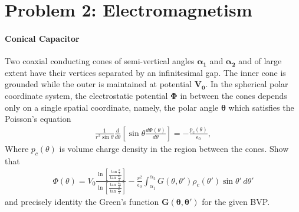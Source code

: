 \documentclass{article}
\begin{document}
{	\section*{Problem 2: Electromagnetism}
	\paragraph{Conical Capacitor} Two coaxial conducting cones of semi-vertical angles $\bm{\alpha_1}$ and $\bm{\alpha_2}$ and of large extent have their vertices separated by an infinitesimal gap. The inner cone is grounded while the outer is maintained at potential $\bm{V_0}$. In the spherical polar coordinate system, the electrostatic potential $\bm{\Phi}$ in between the cones depends only on a single spatial coordinate, namely, the polar angle $\bm{\theta}$ which satisfies the Poisson's equation
		\begin{equation*}
			\begin{split}
				\frac{1}{r^2 \sin \theta} \frac{d}{d\theta} \left[ \sin \theta \frac{d \Phi(\theta)}{d\theta} \right] = -\frac{p_c(\theta)}{\epsilon_0},
			\end{split}
		\end{equation*}
		Where $p_c(\theta)$ is volume charge density in the region between the cones. Show that
		\begin{equation*}
			\begin{split}
				\Phi(\theta) = V_0 \frac{ \ln \left[ \frac{\tan \tfrac{\theta}{2}} {\tan \tfrac{\alpha_1}{2}} \right] }{ \ln \left[ \frac{\tan \tfrac{\alpha_2}{2}} {\tan \tfrac{\alpha_1}{2}} \right] } - \frac{r^2}{\epsilon_0} \int_{\alpha_1}^{\alpha_2} G(\theta, \theta') \rho_c (\theta') \sin \theta' \, d\theta' 
			\end{split}
		\end{equation*}
		and precisely identity the Green's function $\bm{G(\theta, \theta')}$ for the given BVP.
}
\end{document}
